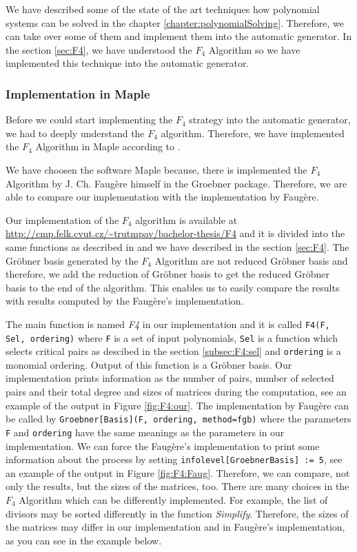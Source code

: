 We have described some of the state of the art techniques how polynomial systems can be solved in the chapter \ref{chapter:polynomialSolving}. Therefore, we can take over some of them and implement them into the automatic generator. In the section \ref{sec:F4}, we have understood the $F_4$ \cite{F4} Algorithm so we have implemented this technique into the automatic generator.

\subsubsection{Implementation in Maple}
Before we could start implementing the $F_4$ strategy into the automatic generator, we had to deeply understand the $F_4$ algorithm. Therefore, we have implemented the $F_4$ Algorithm in Maple according to \cite{F4}. 

We have choosen the software Maple because, there is implemented the $F_4$ Algorithm by J. Ch. Faug\`ere himself in the Groebner package. Therefore, we are able to compare our implementation with the implementation by Faug\`ere.

Our implementation of the $F_4$ algorithm is available at \url{http://cmp.felk.cvut.cz/~trutmpav/bachelor-thesis/F4} and it is divided into the same functions as described in \cite{F4} and we have described in the section \ref{sec:F4}. The Gr\"obner basis generated by the $F_4$ Algorithm are not reduced Gr\"obner basis and therefore, we add the reduction of Gr\"obner basis to get the reduced Gr\"obner basis to the end of the algorithm. This enables us to easily compare the results with results computed by the Faug\`ere's implementation.

The main function is named \textit{F4} in our implementation and it is called \texttt{F4(F, Sel, ordering)} where \texttt{F} is a set of input polynomials, \texttt{Sel} is a function which selects critical pairs as descibed in the section \ref{subsec:F4:sel} and \texttt{ordering} is a monomial ordering. Output of this function is a Gr\"obner basis. Our implementation prints information as the number of pairs, number of selected pairs and their total degree and sizes of matrices during the computation, see an example of the output in Figure \ref{fig:F4:our}. The implementation by Faug\`ere can be called by \texttt{Groebner[Basis](F, ordering, method=fgb)} where the parameters \texttt{F} and \texttt{ordering} have the same meanings as the parameters in our implementation. We can force the Faug\`ere's implementation to print some information about the process by setting \texttt{infolevel[GroebnerBasis] := 5}, see an example of the output in Figure \ref{fig:F4:Faug}. Therefore, we can compare, not only the results, but the sizes of the matrices, too. There are many choices in the $F_4$ Algorithm which can be differently implemented. For example, the list of divisors may be sorted differently in the function \textit{Simplify}. Therefore, the sizes of the matrices may differ in our implementation and in Faug\`ere's implementation, as you can see in the example below.

